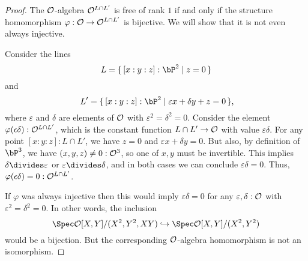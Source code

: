 \begin{proof}
  The $\mathcal O$-algebra $\mathcal O^{L \cap L'}$ is free of rank $1$
  if and only if the structure homomorphism
  $\varphi : \mathcal O \to \mathcal O^{L \cap L'}$ is bijective.
  We will show that it is not even always injective.

  Consider the lines
  \[ L = \{\, [x : y : z] : \bP^2 \mid z = 0 \,\} \]
  and
  \[ L' = \{\, [x : y : z] : \bP^2 \mid \varepsilon x + \delta y + z = 0 \,\}
     \rlap{,} \]
  where $\varepsilon$ and $\delta$ are elements of $\mathcal O$
  with $\varepsilon^2 = \delta^2 = 0$.
  Consider the element $\varphi(\epsilon \delta) : \mathcal O^{L \cap L'}$,
  which is the constant function $L \cap L' \to \mathcal O$
  with value $\varepsilon \delta$.
  For any point $[x : y : z] : L \cap L'$,
  we have $z = 0$ and $\varepsilon x + \delta y = 0$.
  But also, by definition of $\bP^3$,
  we have $(x, y, z) \neq 0 : \mathcal O^3$,
  so one of $x, y$ must be invertible.
  This implies $\delta \divides \varepsilon$ or $\varepsilon \divides \delta$,
  and in both cases we can conclude $\varepsilon \delta = 0$.
  Thus, $\varphi(\epsilon \delta) = 0 : \mathcal O^{L \cap L'}$.

  If $\varphi$ was always injective
  then this would imply $\varepsilon \delta = 0$
  for any $\varepsilon, \delta : \mathcal O$
  with $\varepsilon^2 = \delta^2 = 0$.
  In other words, the inclusion
  \[ \Spec \A[X, Y]/(X^2, Y^2, XY) \hookrightarrow \Spec \A[X, Y]/(X^2, Y^2) \]
  would be a bijection.
  But the corresponding $\mathcal O$-algebra homomorphism is not an isomorphism.
\end{proof}
